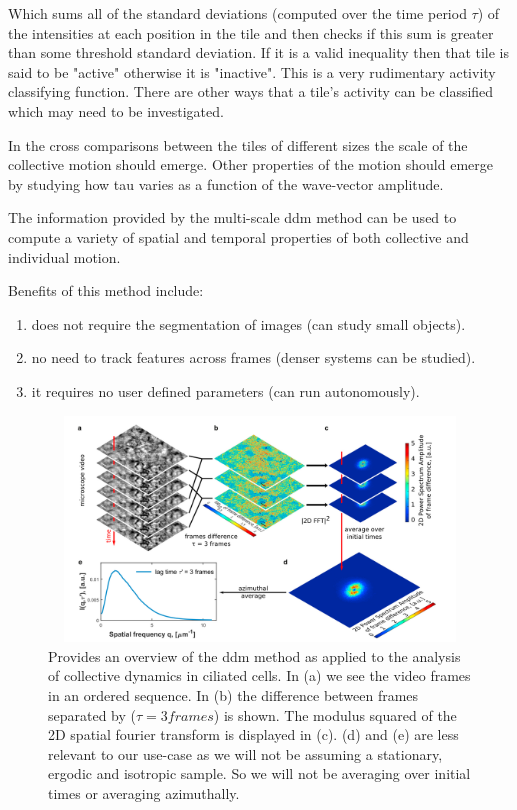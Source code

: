 \documentclass[11pt]{article}
\begin{document}
Which sums all of the standard deviations (computed over the time period $\tau$) of the intensities at each position in the tile and then checks if this sum is greater than some threshold standard deviation.
If it is a valid inequality then that tile is said to be "active" otherwise it is "inactive".\cite{ddm2}
This is a very rudimentary activity classifying function.
There are other ways that a tile's activity can be classified which may need to be investigated.

In the cross comparisons between the tiles of different sizes the scale of the collective motion should emerge.\cite{ddm1}
Other properties of the motion should emerge by studying how tau varies as a function of the wave-vector amplitude.\cite{ddm1}

The information provided by the multi-scale ddm method can be used to compute a variety of spatial and temporal properties of both collective and individual motion.\cite{ddm1}\cite{ddm2}

Benefits of this method include:
\begin {enumerate}
 \item does not require the segmentation of images (can study small objects).
 \item no need to track features across frames (denser systems can be studied).
 \item it requires no user defined parameters (can run autonomously).
\end{enumerate}\cite{ddm1}

\begin{figure}
\includegraphics[width=15cm, height=6cm]{ddmpic.png}
\caption{Provides an overview of the ddm method as applied to the analysis of collective dynamics in ciliated cells.
In (a) we see the video frames in an ordered sequence.
In (b) the difference between frames separated by ($\tau=3 frames$) is shown.
The modulus squared of the 2D spatial fourier transform is displayed in (c).
(d) and (e) are less relevant to our use-case as we will not be assuming a stationary, ergodic and isotropic sample.
So we will not be averaging over initial times or averaging azimuthally.\cite{ddm2}}
\end{figure}
\end{document}
